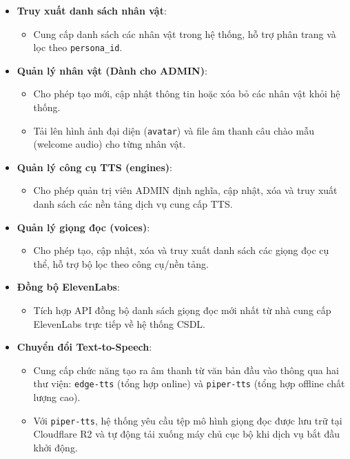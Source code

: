 \begin{itemize}
\item \textbf{Truy xuất danh sách nhân vật}:
\begin{itemize}
\item Cung cấp danh sách các nhân vật trong hệ thống, hỗ trợ phân trang và lọc theo \texttt{persona\_id}.
\end{itemize}

\item \textbf{Quản lý nhân vật (Dành cho ADMIN)}:
\begin{itemize}
\item Cho phép tạo mới, cập nhật thông tin hoặc xóa bỏ các nhân vật khỏi hệ thống.
\item Tải lên hình ảnh đại diện (\texttt{avatar}) và file âm thanh câu chào mẫu (welcome audio) cho từng nhân vật.
\end{itemize}

\item \textbf{Quản lý công cụ TTS (engines)}:
\begin{itemize}
\item Cho phép quản trị viên ADMIN định nghĩa, cập nhật, xóa và truy xuất danh sách các nền tảng dịch vụ cung cấp TTS.
\end{itemize}

\item \textbf{Quản lý giọng đọc (voices)}:
\begin{itemize}
\item Cho phép tạo, cập nhật, xóa và truy xuất danh sách các giọng đọc cụ thể, hỗ trợ bộ lọc theo công cụ/nền tảng.
\end{itemize}

\item \textbf{Đồng bộ ElevenLabs}:
\begin{itemize}
\item Tích hợp API đồng bộ danh sách giọng đọc mới nhất từ nhà cung cấp ElevenLabs trực tiếp về hệ thống CSDL.
\end{itemize}

\item \textbf{Chuyển đổi Text-to-Speech}:
\begin{itemize}
\item Cung cấp chức năng tạo ra âm thanh từ văn bản đầu vào thông qua hai thư viện: \texttt{edge-tts} (tổng hợp online) và \texttt{piper-tts} (tổng hợp offline chất lượng cao).
\item Với \texttt{piper-tts}, hệ thống yêu cầu tệp mô hình giọng đọc được lưu trữ tại Cloudflare R2 và tự động tải xuống máy chủ cục bộ khi dịch vụ bắt đầu khởi động.
\end{itemize}


\end{itemize}
